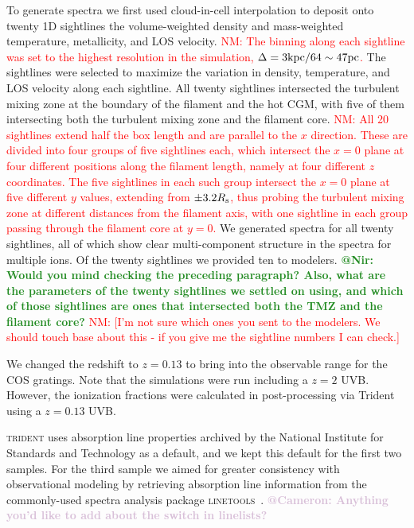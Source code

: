 \documentclass[fleqn,usenatbib]{mnras}
\makeatletter
\newcommand{\atcameron}[1]{\textcolor{Thistle}{\textbf{@Cameron: #1}}}
\newcommand{\atnir}[1]{\textcolor{ForestGreen}{\textbf{@Nir: #1}}}
\newcommand{\nmr}[1]{\textcolor{red}{NM: #1}}
\makeatother
\begin{document}
To generate spectra we first used cloud-in-cell interpolation to deposit onto twenty 1D sightlines the volume-weighted density and mass-weighted temperature, metallicity, and LOS velocity. \nmr{The binning along each sightline was set to the highest resolution in the simulation, $\Delta=3{\rm kpc}/64\sim 47{\rm pc}$.} The sightlines were selected to maximize the variation in density, temperature, and LOS velocity along each sightline. All twenty sightlines intersected the turbulent mixing zone at the boundary of the filament and the hot CGM, with five of them intersecting both the turbulent mixing zone and the filament core. \nmr{All 20 sightlines extend half the box length and are parallel to the $x$ direction. These are divided into four groups of five sightlines each, which intersect the $x=0$ plane at four different positions along the filament length, namely at four different $z$ coordinates. The five sightlines in each such group intersect the $x=0$ plane at five different $y$ values, extending from $\pm 3.2R_{\rm s}$, thus probing the turbulent mixing zone at different distances from the filament axis, with one sightline in each group passing through the filament core at $y=0$.}  We generated spectra for all twenty sightlines, all of which show clear multi-component structure in the spectra for multiple ions. Of the twenty sightlines we provided ten to modelers. \atnir{Would you mind checking the preceding paragraph? Also, what are the parameters of the twenty sightlines we settled on using, and which of those sightlines are ones that intersected both the TMZ and the filament core?} \nmr{[I'm not sure which ones you sent to the modelers. We should touch base about this - if you give me the sightline numbers I can check.]}

We changed the redshift to $z=0.13$ to bring  into the observable range for the COS gratings.
Note that the simulations were run including a $z=2$ UVB.
However, the ionization fractions were calculated in post-processing via Trident using a $z=0.13$ \cite{Haardt2012} UVB.

\textsc{trident} uses absorption line properties archived by the National Institute for Standards and Technology as a default, and we kept this default for the first two samples.
For the third sample we aimed for greater consistency with observational modeling by retrieving absorption line information from the commonly-used spectra analysis package \textsc{linetools}~\citep{Prochaska2016}.
\atcameron{Anything you'd like to add about the switch in linelists?}
\end{document}
